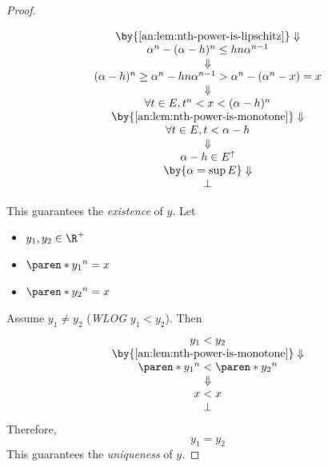 \begin{proof}
\begin{itemize}
\[\begin{array}{c}
              \by{\Cref{an:lem:nth-power-is-lipschitz}} \Downarrow                                    \\
              \alpha^{n} - (\alpha - h)^{n} \leq hn\alpha^{n - 1}                                     \\
              \Downarrow                                                                              \\
              (\alpha - h)^{n} \geq \alpha^{n} - hn\alpha^{n - 1} > \alpha^{n} - (\alpha^{n} - x) = x \\
              \Downarrow                                                                              \\
              \forall t \in E, t^{n} < x < (\alpha - h)^{n}                                           \\
              \by{\Cref{an:lem:nth-power-is-monotone}} \Downarrow                                     \\
              \forall t \in E, t < \alpha - h                                                         \\
              \Downarrow                                                                              \\
              \alpha - h \in E^{\uparrow}                                                             \\
              \by{\ensuremath{\alpha = \sup E}} \Downarrow                                            \\
              \bot
            \end{array}
          \]
  \end{itemize}
  This guarantees the \emph{existence} of $y$. Let
  \begin{itemize}
    \item $y_{1}, y_{2} \in \R^{+}$
    \item $\paren*{y_{1}}^{n} = x$
    \item $\paren*{y_{2}}^{n} = x$
  \end{itemize}
  Assume $y_{1} \neq y_{2}$ (\emph{WLOG} $y_{1} < y_{2}$). Then
  \[
    \begin{array}{c}
      y_{1} < y_{2}                                       \\
      \by{\Cref{an:lem:nth-power-is-monotone}} \Downarrow \\
      \paren*{y_{1}}^{n} < \paren*{y_{2}}^{n}             \\
      \Downarrow                                          \\
      x < x                                               \\
      \bot
    \end{array}
  \]
  Therefore,
  \[
    y_{1} = y_{2}
  \]
  This guarantees the \emph{uniqueness} of $y$.
\end{proof}

